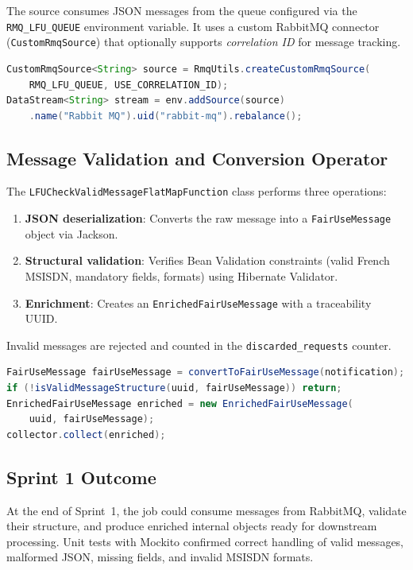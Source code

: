 The source consumes JSON messages from the queue configured via the \texttt{RMQ\_LFU\_QUEUE} environment variable. It uses a custom RabbitMQ connector (\texttt{CustomRmqSource}) that optionally supports \textit{correlation ID} for message tracking.

\begin{lstlisting}[language=Java, caption={RabbitMQ source creation}]
CustomRmqSource<String> source = RmqUtils.createCustomRmqSource(
    RMQ_LFU_QUEUE, USE_CORRELATION_ID);
DataStream<String> stream = env.addSource(source)
    .name("Rabbit MQ").uid("rabbit-mq").rebalance();
\end{lstlisting}

\subsection{Message Validation and Conversion Operator}

The \texttt{LFUCheckValidMessageFlatMapFunction} class performs three operations:
\begin{enumerate}
    \item \textbf{JSON deserialization}: Converts the raw message into a \texttt{FairUseMessage} object via Jackson.
    \item \textbf{Structural validation}: Verifies Bean Validation constraints (valid French MSISDN, mandatory fields, formats) using Hibernate Validator.
    \item \textbf{Enrichment}: Creates an \texttt{EnrichedFairUseMessage} with a traceability UUID.
\end{enumerate}

Invalid messages are rejected and counted in the \texttt{discarded\_requests} counter.

\begin{lstlisting}[language=Java, caption={Incoming message validation}]
FairUseMessage fairUseMessage = convertToFairUseMessage(notification);
if (!isValidMessageStructure(uuid, fairUseMessage)) return;
EnrichedFairUseMessage enriched = new EnrichedFairUseMessage(
    uuid, fairUseMessage);
collector.collect(enriched);
\end{lstlisting}

\subsection{Sprint 1 Outcome}

At the end of Sprint~1, the job could consume messages from RabbitMQ, validate their structure, and produce enriched internal objects ready for downstream processing. Unit tests with Mockito confirmed correct handling of valid messages, malformed JSON, missing fields, and invalid MSISDN formats.

